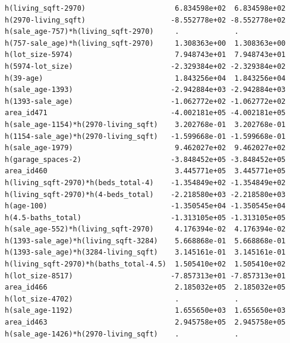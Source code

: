 \documentclass[
]{article}
\begin{document}
\begin{verbatim}
h(living_sqft-2970)                     6.834598e+02  6.834598e+02
h(2970-living_sqft)                    -8.552778e+02 -8.552778e+02
h(sale_age-757)*h(living_sqft-2970)     .             .           
h(757-sale_age)*h(living_sqft-2970)     1.308363e+00  1.308363e+00
h(lot_size-5974)                        7.948743e+01  7.948743e+01
h(5974-lot_size)                       -2.329384e+02 -2.329384e+02
h(39-age)                               1.843256e+04  1.843256e+04
h(sale_age-1393)                       -2.942884e+03 -2.942884e+03
h(1393-sale_age)                       -1.062772e+02 -1.062772e+02
area_id471                             -4.002181e+05 -4.002181e+05
h(sale_age-1154)*h(2970-living_sqft)    3.202768e-01  3.202768e-01
h(1154-sale_age)*h(2970-living_sqft)   -1.599668e-01 -1.599668e-01
h(sale_age-1979)                        9.462027e+02  9.462027e+02
h(garage_spaces-2)                     -3.848452e+05 -3.848452e+05
area_id460                              3.445771e+05  3.445771e+05
h(living_sqft-2970)*h(beds_total-4)    -1.354849e+02 -1.354849e+02
h(living_sqft-2970)*h(4-beds_total)    -2.218580e+03 -2.218580e+03
h(age-100)                             -1.350545e+04 -1.350545e+04
h(4.5-baths_total)                     -1.313105e+05 -1.313105e+05
h(sale_age-552)*h(living_sqft-2970)     4.176394e-02  4.176394e-02
h(1393-sale_age)*h(living_sqft-3284)    5.668868e-01  5.668868e-01
h(1393-sale_age)*h(3284-living_sqft)    3.145161e-01  3.145161e-01
h(living_sqft-2970)*h(baths_total-4.5)  1.505410e+02  1.505410e+02
h(lot_size-8517)                       -7.857313e+01 -7.857313e+01
area_id466                              2.185032e+05  2.185032e+05
h(lot_size-4702)                        .             .           
h(sale_age-1192)                        1.655650e+03  1.655650e+03
area_id463                              2.945758e+05  2.945758e+05
h(sale_age-1426)*h(2970-living_sqft)    .             .           
                                                                  

\end{verbatim}
\end{document}
